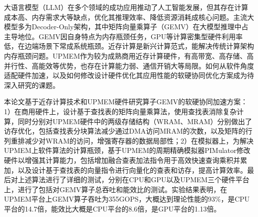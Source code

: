 \begin{abstractzh}
大语言模型（LLM）在多个领域的成功应用推动了人工智能发展，但其存在计算成本高、内存需求大等缺点，优化其推理效率、降低资源消耗成核心问题。主流大模型多为Decoder-Only架构，其中矩阵向量乘算子（GEMV）在大模型推理中占主导地位。GEMV因自身特点为内存瓶颈任务，GPU等计算密集型硬件利用率低，在边端场景下常成系统瓶颈。近存计算是新兴计算范式，能解决传统计算架构内存瓶颈问题。UPMEM作为较为成熟商用近存计算硬件，有高带宽、高存储、高并行性、高能效等优势，也存在计算能力弱、通信开销大等局限。如何从软件角度适配硬件加速，以及如何修改设计硬件优化其应用性能的软硬协同优化方案成为待深入研究的课题。

本论文基于近存计算技术和UPMEM硬件研究算子GEMV的软硬协同加速方案：1）在商用硬件上，设计基于查找表的矩阵向量乘算法，使用查找表消除复杂计算，同时分别对UPMEM硬件中的两级存储结构（WRAM、MRAM）分别做出了访存优化，包括查找表分块算法减少通过DMA访问MRAM的次数，以及矩阵的行列重排减少对WRAM的访问，增强寄存器的数据局部性；2）在模拟器上，为解决UPMEM上软件算法的计算瓶颈，基于UPMEM的周期精确模拟器PIMulator修改硬件以增强其计算能力，包括增加融合查表加法指令用于高效快速查询乘积并累加，以及设计基于查找表的向量指令进行向量化的查表和访存，提高计算效率。最后对上述算法进行了详细的测试，分别在CPU和GPU以及UPMEM三个硬件平台上，进行了包括对GEMV算子总吞吐和能效比的测试。实验结果表明，在UPMEM平台上GEMV算子吞吐为355GOPS，大概达到理论性能的93\%，是CPU平台的14.7倍，能效比大概是CPU平台的8.6倍，是GPU平台的1.13倍。
\end{abstractzh}